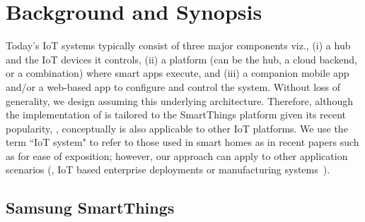 \chapter{Background and Synopsis}
Today's IoT systems
\cite{Samsung:smartthings,Apple:homekit,Amazon:alexa,
Vera:homecontroller,Intel:smartbuildings,Logitech:harmony,Microsoft:iot}
typically consist of three major components viz.,
(i) a hub and the IoT devices it controls,
(ii) a platform (can be the hub, a cloud backend, or a combination)
where smart apps execute, and
(iii) a companion mobile app and/or a web-based app
to configure and control the system.
Without loss of generality, we design \sys assuming this underlying architecture.
Therefore, although {\color{black}the implementation of \sys} is tailored to the SmartThings platform
given its recent popularity,
\cite{Earlence:smarthomesecurityanalysis,Earlence:flowfence,Jia:contexiot,203866,215955,217632},
conceptually \sys is also applicable to other IoT platforms.
We use the term ``IoT system" to refer to those used in smart homes
as in recent papers such as \cite{Earlence:smarthomesecurityanalysis,Earlence:flowfence,Jia:contexiot,203866,215955,217632}
for ease of exposition; however, our approach can apply to other
application scenarios (\eg, IoT based enterprise deployments or manufacturing
systems~\cite{IBM:iot,Microsoft:manufacturing,CropMetrics:iot,Medria:iot}).

\section{Samsung SmartThings}
